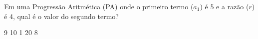 Em uma Progressão Aritmética (PA) onde o primeiro termo ($a_1$) é 5 e a razão ($r$) é 4, qual é o valor do segundo termo?

9
10
1
20
8





